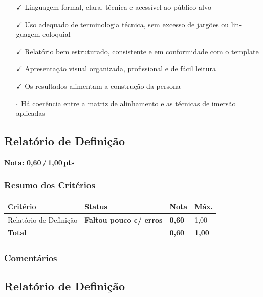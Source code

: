 \documentclass[
  sigconf,
  nonacm, %
  language=portuguese
]{acmart}
\newcommand{\notadestaque}[2]{%
  \noindent\textbf{Nota:}\enspace%
  {\large\bfseries\color{cred}#1\,/\,#2\,pts}%
}
\newcommand{\statuswarn}[1]{{\small\bfseries\color{cwarn}#1}}
\begin{document}
\begin{itemize}[leftmargin=14pt,itemsep=1pt,topsep=3pt,parsep=0pt]
  \item[\textcolor{cgood}{$\checkmark$}] {\small\textcolor{cgood}{Linguagem formal, clara, técnica e acessível ao público-alvo}}
  \item[\textcolor{cgood}{$\checkmark$}] {\small\textcolor{cgood}{Uso adequado de terminologia técnica, sem excesso de jargões ou lin- guagem coloquial}}
  \item[\textcolor{cgood}{$\checkmark$}] {\small\textcolor{cgood}{Relatório bem estruturado, consistente e em conformidade com o template}}
  \item[\textcolor{cgood}{$\checkmark$}] {\small\textcolor{cgood}{Apresentação visual organizada, profissional e de fácil leitura}}
  \item[\textcolor{cgood}{$\checkmark$}] {\small\textcolor{cgood}{Os resultados alimentam a construção da persona}}
  \item[$\square$] {\small\textcolor{cmuted}{Há coerência entre a matriz de alinhamento e as técnicas de imersão aplicadas}}
\end{itemize}

\subsection{Relatório de Definição}

\notadestaque{0,60}{1,00}

\subsubsection*{Resumo dos Critérios}

\begin{tabular}{@{} L{2.6cm} C{2.5cm} C{1.1cm} C{1.1cm} @{}}
\toprule
\textbf{Critério} & \textbf{Status} & \textbf{Nota} & \textbf{Máx.} \\
\midrule
Relatório de Definição & \statuswarn{Faltou pouco c/ erros} & \textbf{0,60} & 1,00 \\
\midrule
\textbf{Total} & & \textbf{\color{cred}0,60} & \textbf{1,00} \\
\bottomrule
\end{tabular}

\subsubsection*{Comentários}

\subsection{Relatório de Definição}
\end{document}
